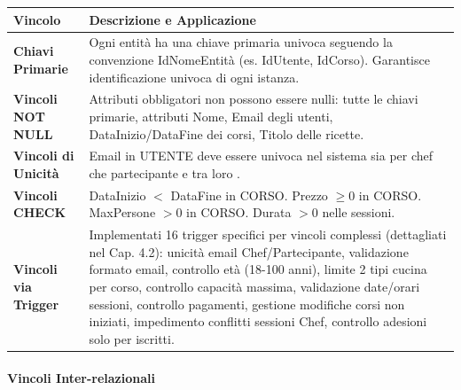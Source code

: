 \begin{center}
\begin{tcolorbox}[colback=white!98!gray, colframe=myblue!80!black, title=Vincoli Intra-relazionali, arc=4mm, boxrule=0.8pt, width=0.98\textwidth]
\renewcommand{\arraystretch}{1.2}
\begin{tabularx}{\textwidth}{p{4cm}X}
\textbf{Vincolo} & \textbf{Descrizione e Applicazione} \\
\hline
\textbf{Chiavi Primarie} & Ogni entità ha una chiave primaria univoca seguendo la convenzione IdNomeEntità (es. IdUtente, IdCorso). Garantisce identificazione univoca di ogni istanza. \\
\hline
\textbf{Vincoli NOT NULL} & Attributi obbligatori non possono essere nulli: tutte le chiavi primarie, attributi Nome, Email degli utenti, DataInizio/DataFine dei corsi, Titolo delle ricette. \\
\hline
\textbf{Vincoli di Unicità} & Email in UTENTE deve essere univoca nel sistema sia per chef che partecipante e tra loro . \\
\hline
\textbf{Vincoli CHECK} & DataInizio $<$ DataFine in CORSO. Prezzo $\geq 0$ in CORSO. MaxPersone $> 0$ in CORSO. Durata $> 0$ nelle sessioni. \\
\hline
\textbf{Vincoli via Trigger} & Implementati 16 trigger specifici per vincoli complessi (dettagliati nel Cap. 4.2): unicità email Chef/Partecipante, validazione formato email, controllo età (18-100 anni), limite 2 tipi cucina per corso, controllo capacità massima, validazione date/orari sessioni, controllo pagamenti, gestione modifiche corsi non iniziati, impedimento conflitti sessioni Chef, controllo adesioni solo per iscritti. \\
\hline
\end{tabularx}
\end{tcolorbox}
\end{center}

\paragraph{Vincoli Inter-relazionali}

